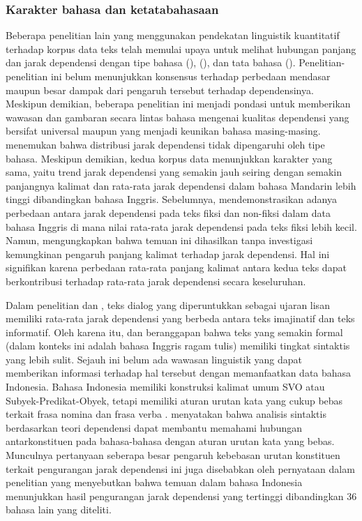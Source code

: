 \subsubsection{Karakter bahasa dan ketatabahasaan}
Beberapa penelitian lain yang menggunakan pendekatan linguistik kuantitatif terhadap korpus data teks telah memulai upaya untuk melihat hubungan panjang dan jarak dependensi dengan tipe bahasa (\citealp{hiranuma1999syntactic, eppler2005syntax, liu2012quantitative}), (\citealp{oya2011syntactic, ferrer2014risks, jiang2015effects}), dan tata bahasa (\citealp{liu2008dependency, gildea2010grammars}). Penelitian-penelitian ini belum menunjukkan konsensus terhadap perbedaan mendasar maupun besar dampak dari pengaruh tersebut terhadap dependensinya. Meskipun demikian, beberapa penelitian ini menjadi pondasi untuk memberikan wawasan dan gambaran secara lintas bahasa mengenai kualitas dependensi yang bersifat universal maupun yang menjadi keunikan bahasa masing-masing. \cite{jiang2015effects} menemukan bahwa distribusi jarak dependensi tidak dipengaruhi oleh tipe bahasa. Meskipun demikian, kedua korpus data menunjukkan karakter yang sama, yaitu trend jarak dependensi yang semakin jauh seiring dengan semakin panjangnya kalimat dan rata-rata jarak dependensi dalam bahasa Mandarin lebih tinggi dibandingkan bahasa Inggris. Sebelumnya, \cite{oya2013degree} mendemonstrasikan adanya perbedaan antara jarak dependensi pada teks fiksi dan non-fiksi dalam data bahasa Inggris di mana nilai rata-rata jarak dependensi pada teks fiksi lebih kecil. Namun, \cite{wang2017effects} mengungkapkan bahwa temuan ini dihasilkan tanpa investigasi kemungkinan pengaruh panjang kalimat terhadap jarak dependensi. Hal ini signifikan karena perbedaan rata-rata panjang kalimat antara kedua teks dapat berkontribusi terhadap rata-rata jarak dependensi secara keseluruhan.

Dalam penelitian \cite{hiranuma1999syntactic} dan \cite{liu2009chinese}, teks dialog yang diperuntukkan sebagai ujaran lisan memiliki rata-rata jarak dependensi yang berbeda antara teks imajinatif dan teks informatif. Oleh karena itu, \cite{hiranuma1999syntactic} dan \cite{liu2009chinese} beranggapan bahwa teks yang semakin formal (dalam konteks ini adalah bahasa Inggris ragam tulis) memiliki tingkat sintaktis yang lebih sulit. Sejauh ini belum ada wawasan linguistik yang dapat memberikan informasi terhadap hal tersebut dengan memanfaatkan data bahasa Indonesia. Bahasa Indonesia memiliki konstruksi kalimat umum SVO atau Subyek-Predikat-Obyek, tetapi memiliki aturan urutan kata yang cukup bebas terkait frasa nomina dan frasa verba \citep{irmawati2015dependency}. \cite{kubler2009dependency} menyatakan bahwa analisis sintaktis berdasarkan teori dependensi dapat membantu memahami hubungan antarkonstituen pada bahasa-bahasa dengan aturan urutan kata yang bebas. Munculnya pertanyaan seberapa besar pengaruh kebebasan urutan konstituen terkait pengurangan jarak dependensi ini juga disebabkan oleh pernyataan dalam penelitian \cite{futrell2015large} yang menyebutkan bahwa temuan dalam bahasa Indonesia menunjukkan hasil pengurangan jarak dependensi yang tertinggi dibandingkan 36 bahasa lain yang diteliti.

